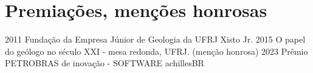 \documentclass[letterpaper]{twentyonesecondcv} %
\begin{document}
{    \section{Premiações, menções honrosas}
    
    \begin{twentyshort}
      \twentyitemshort
        {2011}
        {Fundação da Empresa Júnior de Geologia da UFRJ Xisto Jr.}
      \twentyitemshort
        {2015}
	    {O papel do geólogo no século XXI - mesa redonda, UFRJ. (menção honrosa)}
      \twentyitemshort
	    {2023}
	    {Prêmio PETROBRAS de inovação - SOFTWARE achillesBR}

    \end{twentyshort}

}

\clearpage  %
\end{document}
